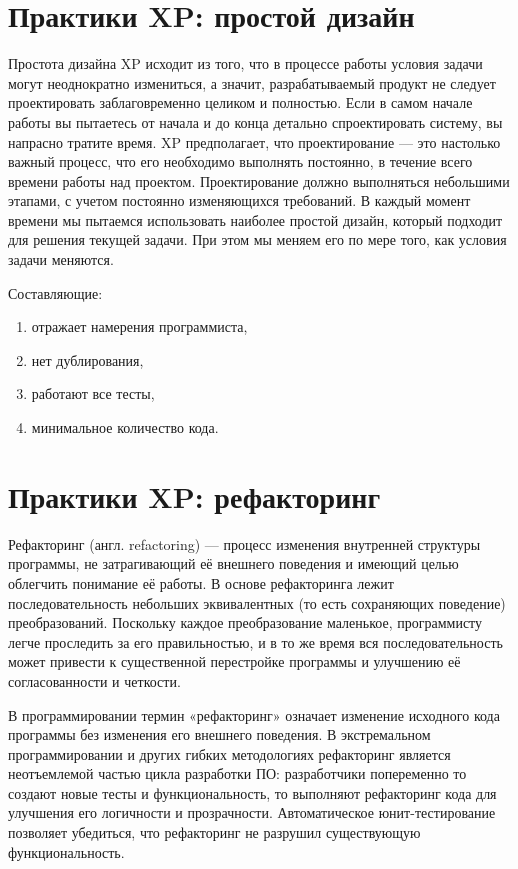 \documentclass{article}
\let\stdsection\section
\renewcommand\section{\newpage\stdsection}
\begin{document}
\section{Практики XP: простой дизайн}
    Простота дизайна XP исходит из того, что в процессе работы условия задачи могут неоднократно измениться, а значит, разрабатываемый продукт не следует проектировать заблаговременно целиком и полностью. Если в самом начале работы вы пытаетесь от начала и до конца детально спроектировать систему, вы напрасно тратите время. XP предполагает, что проектирование — это настолько важный процесс, что его необходимо выполнять постоянно, в течение всего времени работы над проектом. Проектирование должно выполняться небольшими этапами, с учетом постоянно изменяющихся требований. В каждый момент времени мы пытаемся использовать наиболее простой дизайн, который подходит для решения текущей задачи. При этом мы меняем его по мере того, как условия задачи меняются.

    Составляющие:
    \begin{enumerate}
        \item отражает намерения программиста,
        \item нет дублирования,
        \item работают все тесты,
        \item минимальное количество кода.
    \end{enumerate}

\section{Практики XP: рефакторинг}
    Рефакторинг (англ. refactoring) — процесс изменения внутренней структуры программы, не затрагивающий её внешнего поведения и имеющий целью облегчить понимание её работы. В основе рефакторинга лежит последовательность небольших эквивалентных (то есть сохраняющих поведение) преобразований. Поскольку каждое преобразование маленькое, программисту легче проследить за его правильностью, и в то же время вся последовательность может привести к существенной перестройке программы и улучшению её согласованности и четкости.

    В программировании термин «рефакторинг» означает изменение исходного кода программы без изменения его внешнего поведения. В экстремальном программировании и других гибких методологиях рефакторинг является неотъемлемой частью цикла разработки ПО: разработчики попеременно то создают новые тесты и функциональность, то выполняют рефакторинг кода для улучшения его логичности и прозрачности. Автоматическое юнит-тестирование позволяет убедиться, что рефакторинг не разрушил существующую функциональность.
\end{document}
